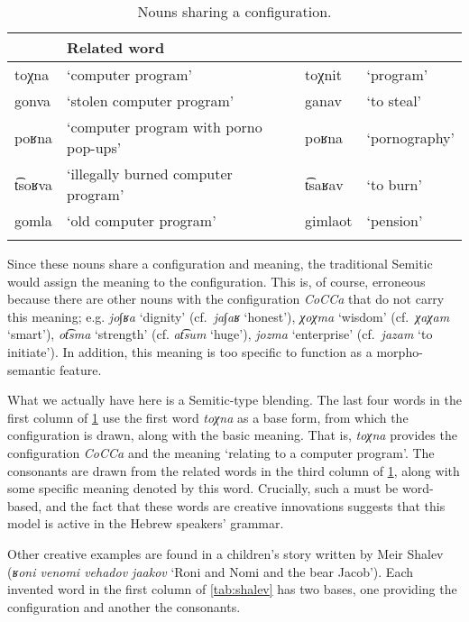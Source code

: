 \documentclass[output=paper,
modfonts
]{LSP/langsci}
\begin{document}
\begin{table}
	\begin{tabular}[t]{llll}
		\lsptoprule
		\multicolumn{2}{l}{CoCCa noun} &
		\multicolumn{2}{l}{Related word} \\
		\midrule
		toχna & `computer program' & toχnit & `program' \\
		gonva & `stolen computer program' &  ganav & `to steal' \\
		poʁna & `computer program with porno pop-ups'  & poʁna & `pornography' \\
		t͡soʁva & `illegally burned computer program' &  t͡saʁav & `to burn' \\
		gomla & `old computer program' & gimlaot & `pension' \\
		\lspbottomrule
	\end{tabular}
	\caption{Nouns sharing a configuration.}
	\label{tab:nconfig}
\end{table}

Since these nouns share a configuration and meaning, the traditional
Semitic  would assign the meaning to the configuration. This
is, of course, erroneous because there are other nouns with the
configuration \emph{CoCCa} that do not carry this meaning; e.g.
\emph{jo∫ʁa} `dignity' (cf.\ \emph{ja∫aʁ} `honest'), \emph{χoχma}
`wisdom' (cf.\ \emph{χaχam} `smart'), \emph{ot͡sma} `strength' (cf.
\emph{at͡sum} `huge'), \emph{jozma} `enterprise' (cf.\ \emph{jazam} `to
initiate'). In addition, this meaning is too specific to function as a
morpho-semantic feature.

What we actually have here is a Semitic-type blending. The last four
words in the first column of \cref{tab:nconfig} use the first word \emph{toχna} as a base form, from which
the configuration is drawn, along with the basic meaning. That is,
\emph{toχna} provides the configuration \emph{CoCCa} and the meaning
`relating to a computer program'. The  consonants are drawn from the
related words in the third column of \cref{tab:nconfig}, along with some specific meaning denoted by this
word. Crucially, such a  must be word-based, and the fact that
these words are creative innovations suggests that this model is active
in the Hebrew speakers' grammar.

Other creative examples are found in a children's story written by Meir
Shalev (\emph{ʁoni venomi vehadov jaakov} `Roni and Nomi and the bear
Jacob'). Each invented word in the first column of \cref{tab:shalev} has two bases, one
providing the configuration and another the consonants.
\end{document}
